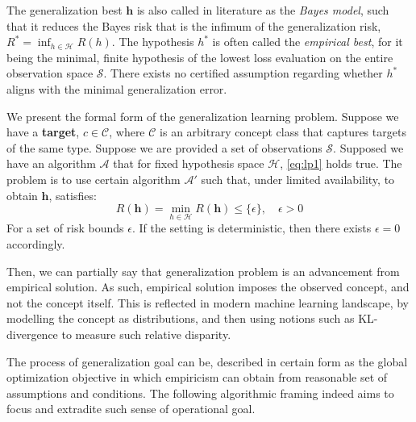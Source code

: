 \documentclass[
  journal=largetwo,
  year=2025,
  volume=37,
]{cup-journal}
\begin{document}
The generalization best $\bm{h}$ is also called in literature as the \textit{Bayes model}, such that it reduces the Bayes risk that is the infimum of the generalization risk, $R^{*}=\inf_{h\in \mathcal{H}}R(h)$. The hypothesis $h^{*}$ is often called the \textit{empirical best}, for it being the minimal, finite hypothesis of the lowest loss evaluation on the entire observation space $\mathcal{S}$. There exists no certified assumption regarding whether $h^{*}$ aligns with the minimal generalization error.

\begin{definition}
    We present the formal form of the generalization learning problem. Suppose we have a \textbf{target}, $c\in\mathcal{C}$, where $\mathcal{C}$ is an arbitrary concept class that captures targets of the same type. Suppose we are provided a set of observations $\mathcal{S}$. Supposed we have an algorithm $\mathcal{A}$ that for fixed hypothesis space $\mathcal{H}$, \eqref{eq:lp1} holds true. The problem is to use certain algorithm $\mathcal{A}'$ such that, under limited availability, to obtain $\bm{h}$, satisfies: \begin{equation}
        R(\bm{h}) = \min_{h\in \mathcal{H}} R(\bm{h}) \leq \{\epsilon\}, \quad \epsilon > 0 
    \end{equation}
    For a set of risk bounds $\epsilon$. If the setting is deterministic, then there exists $\epsilon=0$ accordingly. 
\end{definition}

Then, we can partially say that generalization problem is an advancement from empirical solution. As such, empirical solution imposes the observed concept, and not the concept itself. This is reflected in modern machine learning landscape, by modelling the concept as distributions, and then using notions such as KL-divergence to measure such relative disparity. 

The process of generalization goal can be, described in certain form as the global optimization objective in which empiricism can obtain from reasonable set of assumptions and conditions. The following algorithmic framing indeed aims to focus and extradite such sense of operational goal. 
\end{document}
